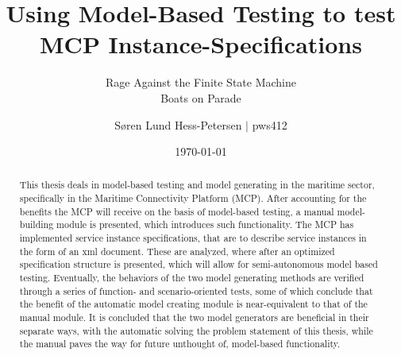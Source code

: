 \documentclass[a4paper,11pt,oneside]{memoir}
\begin{document}

\thesiscomment{} %
\title{Using Model-Based Testing to test MCP Instance-Specifications}
\subtitle{Rage Against the Finite State Machine\\ Boats on Parade} %
\author{Søren Lund Hess-Petersen $|$ pws412}
\date{\today} %

\pagestyle{plain}
\maketitle

\cleardoublepage
{}
\setcounter{page}{3}

\cleardoublepage
\pagestyle{plain}

\begin{abstract}
\noindent
This thesis deals in model-based testing and model generating in the maritime sector, specifically in the Maritime Connectivity Platform (MCP). After accounting for the benefits the MCP will receive on the basis of model-based testing, a manual model-building module is presented, which introduces such functionality. The MCP has implemented service instance specifications, that are to describe service instances in the form of an xml document. These are analyzed, where after an optimized specification structure is presented, which will allow for semi-autonomous model based testing. Eventually, the behaviors of the two model generating methods are verified through a series of function- and scenario-oriented tests, some of which conclude that the benefit of the automatic model creating module is near-equivalent to that of the manual module. It is concluded that the two model generators are beneficial in their separate ways, with the automatic solving the problem statement of this thesis, while the manual paves the way for future unthought of, model-based functionality.
\end{abstract}
\end{document}
